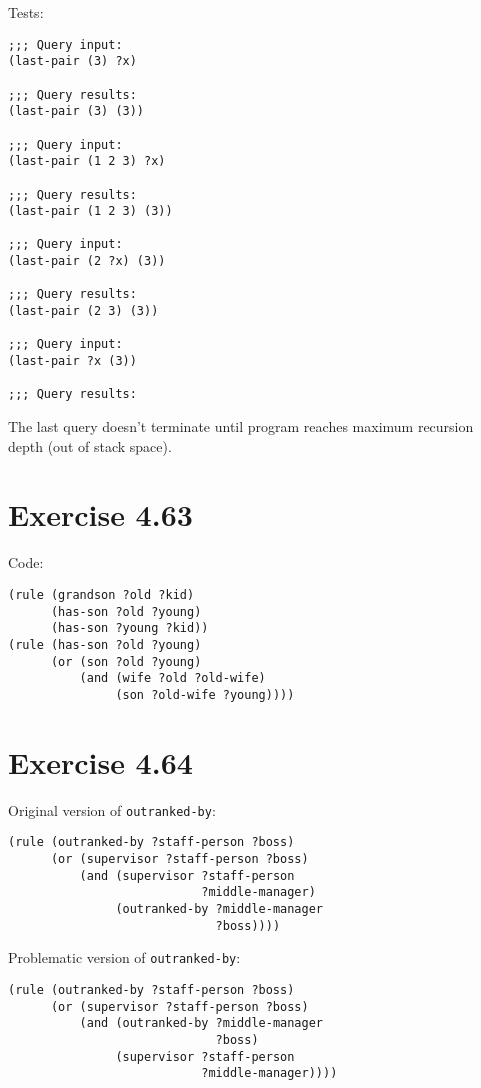 \documentclass[../main.tex]{subfiles}
\begin{document}
Tests:
\begin{lstlisting}
;;; Query input:
(last-pair (3) ?x)

;;; Query results:
(last-pair (3) (3))

;;; Query input:
(last-pair (1 2 3) ?x)

;;; Query results:
(last-pair (1 2 3) (3))

;;; Query input:
(last-pair (2 ?x) (3))

;;; Query results:
(last-pair (2 3) (3))

;;; Query input:
(last-pair ?x (3))

;;; Query results:
\end{lstlisting}

The last query doesn't terminate until program reaches maximum recursion depth (out of stack space).

\section{Exercise 4.63}

Code:

\begin{lstlisting}
(rule (grandson ?old ?kid)
      (has-son ?old ?young)
      (has-son ?young ?kid))
(rule (has-son ?old ?young)
      (or (son ?old ?young)
          (and (wife ?old ?old-wife)
               (son ?old-wife ?young))))
\end{lstlisting}

\section{Exercise 4.64}

Original version of \lstinline{outranked-by}:

\begin{lstlisting}
(rule (outranked-by ?staff-person ?boss)
      (or (supervisor ?staff-person ?boss)
          (and (supervisor ?staff-person
                           ?middle-manager)
               (outranked-by ?middle-manager
                             ?boss))))
\end{lstlisting}

Problematic version of \lstinline{outranked-by}:

\begin{lstlisting}
(rule (outranked-by ?staff-person ?boss)
      (or (supervisor ?staff-person ?boss)
          (and (outranked-by ?middle-manager
                             ?boss)
               (supervisor ?staff-person
                           ?middle-manager))))
\end{lstlisting}
\end{document}

